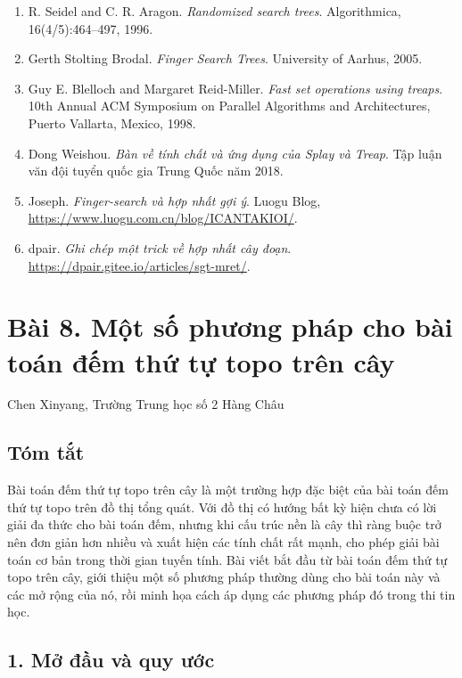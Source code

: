 \documentclass[11pt]{article}
\begin{document}
\begin{enumerate}
  \item R. Seidel and C. R. Aragon. \emph{Randomized search trees}.
  Algorithmica, 16(4/5):464--497, 1996.
  \item Gerth Stolting Brodal. \emph{Finger Search Trees}. University of
  Aarhus, 2005.
  \item Guy E. Blelloch and Margaret Reid-Miller. \emph{Fast set operations
  using treaps}. 10th Annual ACM Symposium on Parallel Algorithms and
  Architectures, Puerto Vallarta, Mexico, 1998.
  \item Dong Weishou. \emph{Bàn về tính chất và ứng dụng của Splay và Treap}.
  Tập luận văn đội tuyển quốc gia Trung Quốc năm 2018.
  \item Joseph. \emph{Finger-search và hợp nhất gợi ý}.
  Luogu Blog, \url{https://www.luogu.com.cn/blog/ICANTAKIOI/}.
  \item dpair. \emph{Ghi chép một trick về hợp nhất cây đoạn}.
  \url{https://dpair.gitee.io/articles/sgt-mret/}.
\end{enumerate}

\section*{Bài 8. Một số phương pháp cho bài toán đếm thứ tự topo trên cây}

\begin{center}
Chen Xinyang, Trường Trung học số 2 Hàng Châu
\end{center}

\subsection*{Tóm tắt}

Bài toán đếm thứ tự topo trên cây là một trường hợp đặc biệt của bài toán đếm
thứ tự topo trên đồ thị tổng quát. Với đồ thị có hướng bất kỳ hiện chưa có lời
giải đa thức cho bài toán đếm, nhưng khi cấu trúc nền là cây thì ràng buộc trở
nên đơn giản hơn nhiều và xuất hiện các tính chất rất mạnh, cho phép giải bài
toán cơ bản trong thời gian tuyến tính. Bài viết bắt đầu từ bài toán đếm thứ tự
topo trên cây, giới thiệu một số phương pháp thường dùng cho bài toán này và
các mở rộng của nó, rồi minh họa cách áp dụng các phương pháp đó trong thi tin
học.

\subsection*{1. Mở đầu và quy ước}
\end{document}
